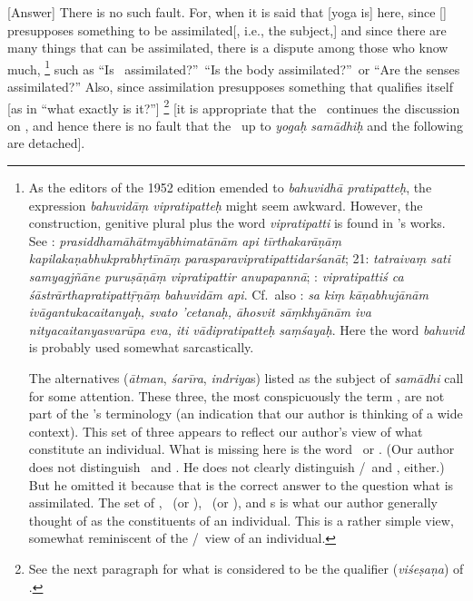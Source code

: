 [Answer]%
 There is no such fault.  For, when it is said that [yoga is] \samadhi\/ here, since [\samadhi] presupposes something to be assimilated[, i.e., the subject,] and since there are many things that can be assimilated, there is a dispute among those who know much,%
  \footnote{As the editors of the 1952 edition emended to \emph{bahuvidhā pratipatteḥ}, the expression \emph{bahuvidāṃ vipratipatteḥ} might seem awkward.  However, the construction, genitive plural plus the word \emph{vipratipatti} is found in \Sankara's works.  See : \emph{prasiddha\-māhātmyā\-bhimatānām api tīrtha\-karāṇāṃ kapila\-kaṇabhu\-kprabhṛtī\-nāṃ paraspara\-vipratipatti\-darśanāt}; 21: \emph{tatraivaṃ sati samyagjñāne puruṣāṇāṃ vipratipattir anupapannā}; : \emph{vipratipattiś ca śāstrārthapratipattṝṇāṃ bahuvidām api}.  Cf.\ also : \emph{sa kiṃ kāṇabhujānām ivāgantukacaitanyaḥ, svato 'cetanaḥ, āhosvit sāṃkhyānām iva nityacaitanyasvarūpa eva, iti vādipratipatteḥ saṃśayaḥ}.  Here the word \emph{bahuvid} is probably used somewhat sarcastically.%

  The alternatives (\emph{ātman}, \emph{śarīra}, \emph{indriya\/}s) listed as the subject of \emph{samādhi\/} call for some attention.  These three, the most conspicuously the term \atman, are not part of the \PYS's terminology (an indication that our author is thinking of a wide context).  This set of three appears to reflect our author's view of what constitute an individual.  What is missing here is the word \manas\ or \citta. (Our author does not distinguish \manas\ and \citta.  He does not clearly distinguish \manas/\citta\ and \buddhi, either.)  But he omitted it because that is the correct answer to the question what is assimilated.  The set of \atman, \manas\ (or \citta), \sarira\ (or \deha), and \indriya s is what our author generally thought of as the constituents of an individual.  This is a rather simple view, somewhat reminiscent of the \Naiyayika/\Vaisesika\ view of an individual.%
  } %
such as ``Is \atman\ assimilated?''\ ``Is the body assimilated?''\ or ``Are the senses assimilated?'' Also, since assimilation presupposes something that qualifies itself [as in ``what exactly is it?'']%
  \footnote{See the next paragraph for what is considered to be the qualifier (\emph{viśeṣaṇa}) of \samadhi.%
  } %
[it is appropriate that the \bhasya\ continues the discussion on \samadhi, and hence there is no fault that the \bhasya\ up to \emph{yogaḥ samādhiḥ} and the following are detached].%
